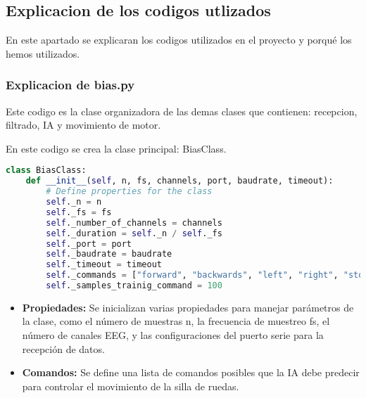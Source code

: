 \documentclass{article}
\begin{document}
\subsection{Explicacion de los codigos utlizados}
En este apartado se explicaran los codigos utilizados en el proyecto y porqué los hemos utilizados.

\subsubsection{Explicacion de bias.py}
Este codigo es la clase organizadora de las demas clases que contienen: recepcion, filtrado, IA y movimiento de motor.

En este codigo se crea la clase principal: BiasClass.
\begin{lstlisting}[language=Python]
    class BiasClass:
    def __init__(self, n, fs, channels, port, baudrate, timeout):
        # Define properties for the class
        self._n = n
        self._fs = fs
        self._number_of_channels = channels
        self._duration = self._n / self._fs
        self._port = port
        self._baudrate = baudrate
        self._timeout = timeout
        self._commands = ["forward", "backwards", "left", "right", "stop", "rest"]
        self._samples_trainig_command = 100
\end{lstlisting}
\begin{itemize}
    \item \textbf{Propiedades:} Se inicializan varias propiedades para manejar parámetros de la clase, como el número de muestras n, la frecuencia de muestreo fs, el número de canales EEG, y las configuraciones del puerto serie para la recepción de datos.
    \item \textbf{Comandos:} Se define una lista de comandos posibles que la IA debe predecir para controlar el movimiento de la silla de ruedas.
\end{itemize}
\end{document}
